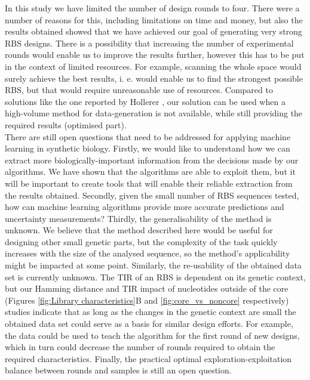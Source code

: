 \documentclass{article}
\begin{document}
In this study we have limited the number of design rounds to four.
There were a number of reasons for this, including limitations on time and money, but also the results obtained showed that we have achieved our goal of generating very strong RBS designs.
There is a possibility that increasing the number of experimental rounds would enable us to improve the results further, however this has to be put in the context of limited resources.
For example, scanning the whole space would surely achieve the best results, i. e. would enable us to find the strongest possible RBS, but that would require unreasonable use of resources.
Compared to solutions like the one reported by Hollerer \cite{Hollerer2020}, our solution can be used when a high-volume method for data-generation is not available, while still providing the required results (optimised part). \\

There are still open questions that need to be addressed for applying machine learning in synthetic biology.
Firstly, we would like to understand how we can extract more biologically-important information from the decisions made by our algorithms.
We have shown that the algorithms are able to exploit them, but it will be important to create tools that will enable their reliable extraction from the results obtained.
Secondly, given the small number of RBS sequences tested, how can machine learning algorithms provide more accurate predictions and uncertainty measurements?
Thirdly, the generalisability of the method is unknown.
We believe that the method described here would be useful for designing other small genetic parts, but the complexity of the task quickly increases with the size of the analysed sequence, so the method's applicability might be impacted at some point.
Similarly, the re-usability of the obtained data set is currently unknown.
The TIR of an RBS is dependent on its genetic context, but our Hamming distance and TIR impact of nucleotides outside of the core (Figures \ref{fig:Library characteristics}B and \ref{fig:core_vs_noncore} respectively) studies indicate that as long as the changes in the genetic context are small the obtained data set could serve as a basis for similar design efforts.
For example, the data could be used to teach the algorithm for the first round of new designs, which in turn could decrease the number of rounds required to obtain the required characteristics.
Finally, the practical optimal exploration-exploitation balance between rounds and samples is still an open question.
\\
\end{document}
